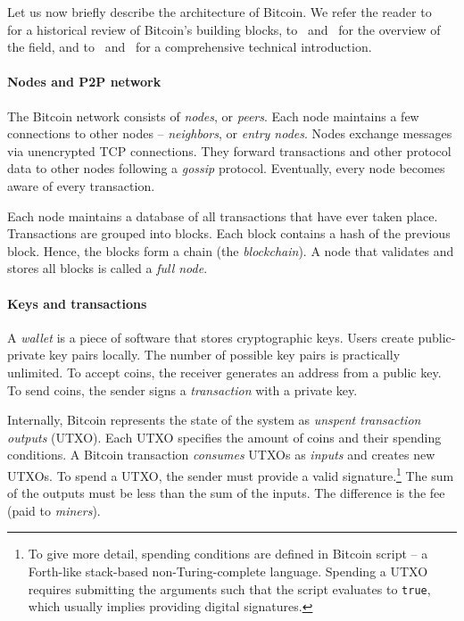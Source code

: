 Let us now briefly describe the architecture of Bitcoin.
We refer the reader to~\cite{Narayanan2017} for a historical review of Bitcoin's building blocks, to~\cite{Bonneau2015} and~\cite{Tschorsch2016} for the overview of the field, and to~\cite{Narayanan2016} and~\cite{Antonopoulos2014} for a comprehensive technical introduction.

\paragraph{Nodes and P2P network}

The Bitcoin network consists of \textit{nodes}, or \textit{peers}.
Each node maintains a few connections to other nodes -- \textit{neighbors}, or \textit{entry nodes}.
Nodes exchange messages via unencrypted TCP connections.
They forward transactions and other protocol data to other nodes following a \textit{gossip} protocol.
Eventually, every node becomes aware of every transaction.

Each node maintains a database of all transactions that have ever taken place.
Transactions are grouped into blocks.
Each block contains a hash of the previous block.
Hence, the blocks form a chain (the \textit{blockchain}).
A node that validates and stores all blocks is called a \textit{full node}.

\paragraph{Keys and transactions}

A \textit{wallet} is a piece of software that stores cryptographic keys.
Users create public-private key pairs locally.
The number of possible key pairs is practically unlimited.
To accept coins, the receiver generates an address from a public key.
To send coins, the sender signs a \textit{transaction} with a private key.

Internally, Bitcoin represents the state of the system as \textit{unspent transaction outputs} (UTXO).
Each UTXO specifies the amount of coins and their spending conditions.
A Bitcoin transaction \textit{consumes} UTXOs as \textit{inputs} and creates new UTXOs.
To spend a UTXO, the sender must provide a valid signature.\footnote{To give more detail, spending conditions are defined in Bitcoin script -- a Forth-like stack-based non-Turing-complete language.
Spending a UTXO requires submitting the arguments such that the script evaluates to \texttt{true}, which usually implies providing digital signatures.}
The sum of the outputs must be less than the sum of the inputs.
The difference is the fee (paid to \textit{miners}).

